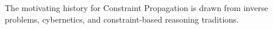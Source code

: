 The motivating history for Constraint Propagation is drawn from inverse problems, cybernetics, and constraint-based reasoning traditions.
